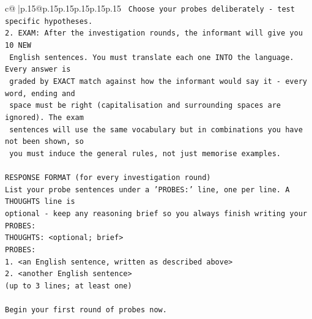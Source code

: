 \documentclass{article}
\begin{document}
{\begin{supertabular}{c@{$\;$}|p{.15\linewidth}@{}p{.15\linewidth}p{.15\linewidth}p{.15\linewidth}p{.15\linewidth}p{.15\linewidth}}
{{{\texttt{   Choose your probes deliberately {-} test specific hypotheses.} \\
\texttt{2. EXAM: After the investigation rounds, the informant will give you 10 NEW} \\
\texttt{   English sentences. You must translate each one INTO the language. Every answer is} \\
\texttt{   graded by EXACT match against how the informant would say it {-} every word, ending and} \\
\texttt{   space must be right (capitalisation and surrounding spaces are ignored). The exam} \\
\texttt{   sentences will use the same vocabulary but in combinations you have not been shown, so} \\
\texttt{   you must induce the general rules, not just memorise examples.} \\
\\ 
\texttt{RESPONSE FORMAT (for every investigation round)} \\
\texttt{List your probe sentences under a 'PROBES:' line, one per line. A THOUGHTS line is} \\
\texttt{optional {-} keep any reasoning brief so you always finish writing your PROBES:} \\
\texttt{THOUGHTS: <optional; brief>} \\
\texttt{PROBES:} \\
\texttt{1. <an English sentence, written as described above>} \\
\texttt{2. <another English sentence>} \\
\texttt{(up to 3 lines; at least one)} \\
\\ 
\texttt{Begin your first round of probes now.} \\
            }
        }
    }
     \\ \\


\end{supertabular}}
\end{document}
